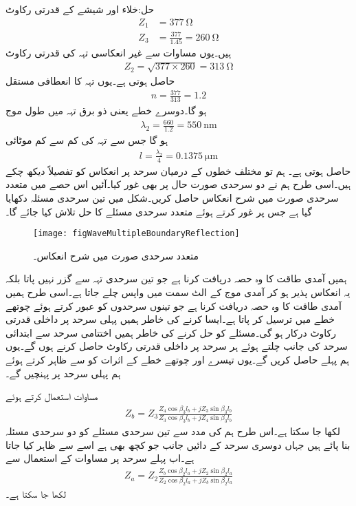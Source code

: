 حل:خلاء اور شیشے کے قدرتی رکاوٹ
\begin{align*}
Z_1&=\SI{377}{\ohm}\\
Z_3&=\frac{377}{1.45}=\SI{260}{\ohm}
\end{align*}
ہیں۔یوں مساوات  سے غیر انعکاسی تہہ کی قدرتی رکاوٹ
\begin{align*}
Z_2=\sqrt{377 \times 260}=\SI{313}{\ohm}
\end{align*}
حاصل ہوتی ہے۔یوں تہہ کا انعطافی مستقل
\begin{align*}
n=\frac{377}{313}=1.2
\end{align*}
ہو گا۔دوسرے خطے یعنی ذو برق تہہ میں طول موج
\begin{align*}
\lambda_2=\frac{660}{1.2}=\SI{550}{\nano\meter}
\end{align*}
ہو گا جس سے تہہ کی کم سے کم موٹائی
\begin{align*}
l=\frac{\lambda_2}{4}=\SI{0.1375}{\micro\meter}
\end{align*}
حاصل ہوتی ہے۔
ہم تو مختلف خطوں کے درمیان سرحد پر انعکاس کو تفصیلاً دیکھ چکے ہیں۔اسی طرح ہم نے دو سرحدی صورت حال پر بھی غور کیا۔آئیں اس حصے میں متعدد سرحدی صورت میں شرح انعکاس حاصل کریں۔شکل  میں تین سرحدی مسئلہ دکھایا گیا ہے جس پر غور کرتے ہوئے متعدد سرحدی مسئلے کا حل تلاش کیا جائے گا۔

\begin{figure}
\centering
\texttt{[image: figWaveMultipleBoundaryReflection]}
\caption{متعدد سرحدی صورت میں شرح انعکاس۔}
\label{شکل_مستوی_متعدد_سرحدی_شرح_انعکاس}
\end{figure}

ہمیں آمدی طاقت کا وہ حصہ دریافت کرنا ہے جو تین سرحدی تہہ سے گزر نہیں پاتا بلکہ یہ انعکاس پذیر ہو کر آمدی موج کے الٹ سمت میں واپس چلے جاتا ہے۔اسی طرح ہمیں آمدی طاقت کا وہ حصہ دریافت کرنا ہے جو تینوں سرحدوں کو عبور کرتے ہوئے چوتھے خطے میں ترسیل کر پاتا ہے۔ایسا کرنے کی خاطر ہمیں پہلی سرحد پر داخلی قدرتی رکاوٹ   درکار ہو گی۔مسئلے کو حل کرنے کی خاطر ہمیں اختتامی سرحد سے ابتدائی سرحد کی جانب چلتے ہوئے  ہر سرحد پر داخلی قدرتی رکاوٹ حاصل کرنے ہوں گے۔یوں ہم پہلے  حاصل کریں گے۔یوں تیسرے اور چوتھے خطے کے اثرات کو  سے ظاہر کرتے ہوئے ہم پہلی سرحد پر پہنچیں گے۔

مساوات  استعمال کرتے ہوئے
\begin{align}
Z_{b}= Z_3 \frac{Z_4 \cos \beta_3 l_b +j Z_3 \sin \beta_3 l_b}{Z_3 \cos \beta_3 l_b +j Z_4\sin \beta_3 l_b}
\end{align}
لکھا جا سکتا ہے۔اس طرح ہم  کی مدد سے تین سرحدی مسئلے کو دو سرحدی مسئلہ بنا پائے ہیں جہاں دوسری سرحد کے دائیں جانب جو کچھ بھی ہے اسے  سے ظاہر کیا جاتا ہے۔اب پہلے سرحد پر مساوات  کے استعمال سے
 \begin{align}
Z_{a}= Z_2 \frac{Z_b \cos \beta_2 l_a +j Z_2 \sin \beta_2 l_a}{Z_2 \cos \beta_2 l_a +j Z_b\sin \beta_2 l_a}
\end{align}
لکھا جا سکتا ہے۔

